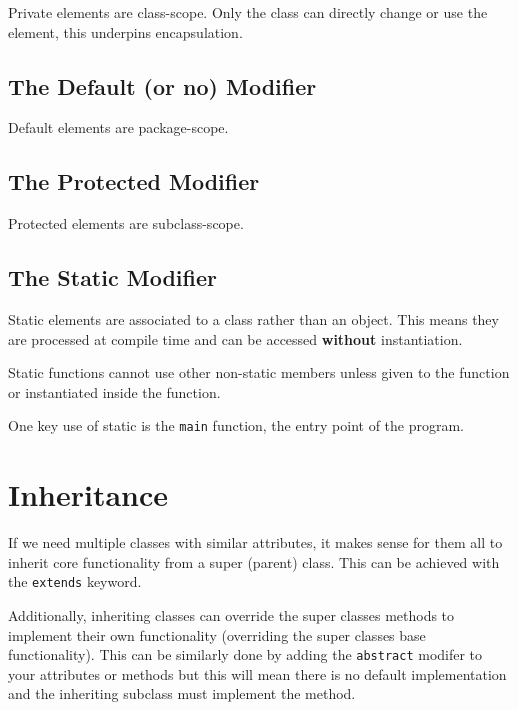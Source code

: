 \documentclass[a4paper, 12pt, twoside]{article}
\begin{document}
Private elements are class-scope. Only the class can directly
change or use the element, this underpins encapsulation.

\subsection{The Default (or no) Modifier}

Default elements are package-scope.

\subsection{The Protected Modifier}

Protected elements are subclass-scope.

\subsection{The Static Modifier}

Static elements are associated to a class rather than an object.
This means they are processed at compile time and can be accessed
\textbf{without} instantiation.

\vspace{\baselineskip}

Static functions cannot use other non-static members unless given
to the function or instantiated inside the function.

\vspace{\baselineskip}

One key use of static is the \texttt{main} function, the entry point
of the program.

\section{Inheritance}

If we need multiple classes with similar attributes, it makes sense
for them all to inherit core functionality from a super (parent) class.
This can be achieved with the \texttt{extends} keyword.

\vspace{\baselineskip}

Additionally, inheriting classes can override the super classes methods
to implement their own functionality (overriding the super classes
base functionality). This can be similarly done by adding the
\texttt{abstract} modifer to your attributes or methods but this will
mean there is no default implementation and the inheriting subclass
must implement the method.
\end{document}
